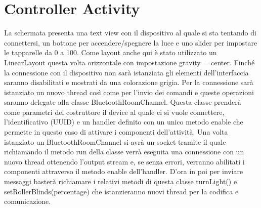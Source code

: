 \documentclass[a4paper]{report}
\begin{document}
\section{Controller Activity}
La schermata presenta una text view con il dispositivo al quale si sta tentando di connettersi, un bottone per accendere/spegnere la luce e uno slider per impostare le tapparelle da 0 a 100.
Come layout anche qui è stato utilizzato un LinearLayout questa volta orizzontale con impostazione gravity = center.
Finché la connessione con il dispositivo non sarà istanziata gli elementi dell'interfaccia saranno disabilitati e mostrati da una colorazione grigia.
Per la connessione sarà istanziato un nuovo thread così come per l'invio dei comandi e queste operazioni saranno delegate alla classe BluetoothRoomChannel.
Questa classe prenderà come parametri del costruttore il device al quale ci si vuole connettere, 
l'identificativo (UUID) e un handler definito con un unico metodo enable che permette in questo caso di attivare i componenti dell'attività. 
Una volta istanziato un BluetoothRoomChannel si avrà un socket tramite il quale richiamando il metodo run della classe verrà eseguita una connessione con un
nuovo thread ottenendo l'output stream e, se senza errori, verranno abilitati i componenti attraverso il metodo enable dell'handler. 
D'ora in poi per inviare messaggi basterà richiamare i relativi metodi di questa classe turnLight() e setRollerBlinds(percentage) che istanzieranno nuovi thread per la codifica e comunicazione.
\end{document}
